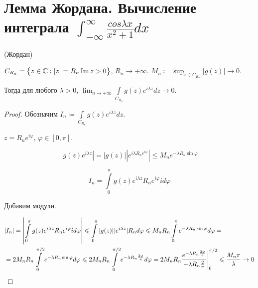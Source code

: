 \section{Лемма Жордана. Вычисление интеграла $\int_{-\infty}^{\infty} \frac{cos \lambda x}{x^2 + 1} dx$}

\begin{lemma}(Жордан)

    $C_{R_n} = \left\{z \in \mathbb{C} : |z| = R_n \operatorname{Im} z > 0\right\}$,
    $R_n \to +\infty$. $M_n \coloneqq \sup_{z\in C_{R_n}} |g(z)| \to 0$.

    Тогда для любого $\lambda > 0$, $\lim_{n\to +\infty}
        \int\limits_{C_{R_n}} g(z)e^{i\lambda z} dz \to 0$.
\end{lemma}

\begin{proof}
    Обозначим $I_n \coloneqq \int\limits_{C_{R_n}} g(z)e^{i\lambda z} dz$.

    $z = R_ne^{i\varphi}$, $\varphi \in \left[0, \pi\right]$.

    \[|g(z) e^{i\lambda z}| = |g(z)| |e^{i\lambda R_n e^{i\varphi} } |
        \le M_n e^{-\lambda R_n \sin \varphi}\]

    \[I_n = \int\limits_0^{\pi} g(z) e^{i\lambda z} R_n e^{i\varphi}
        i d\varphi\]

    Добавим модули.

    \[
        \begin{aligned}[t]
             & |I_n| = \left| \int\limits_0^{\pi} g(z) e^{i\lambda z} R_n e^{i\varphi}
            i d\varphi \right|
            \le \int\limits_0^\pi |g(z)| |e^{i\lambda z}| R_n d\varphi \le M_nR_n
            \int\limits_0^\pi e^{-\lambda R_n \sin\varphi} d\varphi =                  \\
             & = 2M_nR_n
            \int\limits_0^{\pi/2} e^{-\lambda R_n \sin\varphi} d\varphi
            \le 2M_nR_n\int\limits_0^{\pi/2} e^{-\lambda R_n\frac{2\varphi}{\pi}} d\varphi
            = \eval{2M_nR_n \frac{e^{-\lambda R_n \frac{2\varphi}{\pi}}}{-\lambda R_n \frac{2}{\pi}}
            }_0^{\pi/2} \le \frac{M_n \pi}{\lambda} \to 0
        \end{aligned}
    \]
\end{proof}

